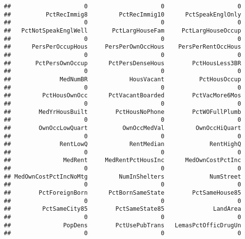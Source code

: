 \documentclass[
]{article}
\newenvironment{Shaded}{\begin{snugshade}}{\end{snugshade}}
\newcommand{\DecValTok}[1]{\textcolor[rgb]{0.00,0.00,0.81}{#1}}
\newcommand{\FunctionTok}[1]{\textcolor[rgb]{0.13,0.29,0.53}{\textbf{#1}}}
\newcommand{\NormalTok}[1]{#1}
\newcommand{\SpecialCharTok}[1]{\textcolor[rgb]{0.81,0.36,0.00}{\textbf{#1}}}
\begin{document}
\begin{verbatim}
##                     0                     0                     0 
##          PctRecImmig8         PctRecImmig10      PctSpeakEnglOnly 
##                     0                     0                     0 
##   PctNotSpeakEnglWell       PctLargHouseFam     PctLargHouseOccup 
##                     0                     0                     0 
##      PersPerOccupHous     PersPerOwnOccHous    PersPerRentOccHous 
##                     0                     0                     0 
##       PctPersOwnOccup      PctPersDenseHous        PctHousLess3BR 
##                     0                     0                     0 
##              MedNumBR            HousVacant          PctHousOccup 
##                     0                     0                     0 
##         PctHousOwnOcc      PctVacantBoarded        PctVacMore6Mos 
##                     0                     0                     0 
##        MedYrHousBuilt        PctHousNoPhone        PctWOFullPlumb 
##                     0                     0                     0 
##        OwnOccLowQuart          OwnOccMedVal         OwnOccHiQuart 
##                     0                     0                     0 
##              RentLowQ            RentMedian             RentHighQ 
##                     0                     0                     0 
##               MedRent     MedRentPctHousInc      MedOwnCostPctInc 
##                     0                     0                     0 
## MedOwnCostPctIncNoMtg         NumInShelters             NumStreet 
##                     0                     0                     0 
##        PctForeignBorn      PctBornSameState        PctSameHouse85 
##                     0                     0                     0 
##         PctSameCity85        PctSameState85              LandArea 
##                     0                     0                     0 
##               PopDens        PctUsePubTrans   LemasPctOfficDrugUn 
##                     0                     0                     0
\end{verbatim}

\begin{Shaded}
\end{Shaded}
\end{document}
